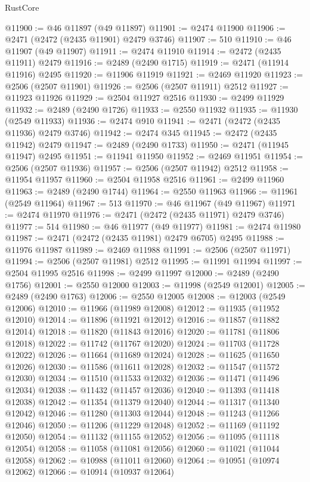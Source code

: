 \begin{lexlean}{RustCore}
\begin{coremodule}
@11900 := @46 @11897 (@49 @11897)
@11901 := @2474 @11900
@11906 := @2471 (@2472 (@2435 @11901) @2479 @3746)
@11907 := 510
@11910 := @46 @11907 (@49 @11907)
@11911 := @2474 @11910
@11914 := @2472 (@2435 @11911) @2479
@11916 := @2489 (@2490 @1715)
@11919 := @2471 (@11914 @11916) @2495
@11920 := @11906 @11919
@11921 := @2469 @11920
@11923 := @2506 (@2507 @11901)
@11926 := @2506 (@2507 @11911) @2512
@11927 := @11923 @11926
@11929 := @2504 @11927 @2516
@11930 := @2499 @11929
@11932 := @2489 (@2490 @1726)
@11933 := @2550 @11932
@11935 := @11930 (@2549 @11933)
@11936 := @2474 @910
@11941 := @2471 (@2472 (@2435 @11936) @2479 @3746)
@11942 := @2474 @345
@11945 := @2472 (@2435 @11942) @2479
@11947 := @2489 (@2490 @1733)
@11950 := @2471 (@11945 @11947) @2495
@11951 := @11941 @11950
@11952 := @2469 @11951
@11954 := @2506 (@2507 @11936)
@11957 := @2506 (@2507 @11942) @2512
@11958 := @11954 @11957
@11960 := @2504 @11958 @2516
@11961 := @2499 @11960
@11963 := @2489 (@2490 @1744)
@11964 := @2550 @11963
@11966 := @11961 (@2549 @11964)
@11967 := 513
@11970 := @46 @11967 (@49 @11967)
@11971 := @2474 @11970
@11976 := @2471 (@2472 (@2435 @11971) @2479 @3746)
@11977 := 514
@11980 := @46 @11977 (@49 @11977)
@11981 := @2474 @11980
@11987 := @2471 (@2472 (@2435 @11981) @2479 @6705) @2495
@11988 := @11976 @11987
@11989 := @2469 @11988
@11991 := @2506 (@2507 @11971)
@11994 := @2506 (@2507 @11981) @2512
@11995 := @11991 @11994
@11997 := @2504 @11995 @2516
@11998 := @2499 @11997
@12000 := @2489 (@2490 @1756)
@12001 := @2550 @12000
@12003 := @11998 (@2549 @12001)
@12005 := @2489 (@2490 @1763)
@12006 := @2550 @12005
@12008 := @12003 (@2549 @12006)
@12010 := @11966 (@11989 @12008)
@12012 := @11935 (@11952 @12010)
@12014 := @11896 (@11921 @12012)
@12016 := @11857 (@11882 @12014)
@12018 := @11820 (@11843 @12016)
@12020 := @11781 (@11806 @12018)
@12022 := @11742 (@11767 @12020)
@12024 := @11703 (@11728 @12022)
@12026 := @11664 (@11689 @12024)
@12028 := @11625 (@11650 @12026)
@12030 := @11586 (@11611 @12028)
@12032 := @11547 (@11572 @12030)
@12034 := @11510 (@11533 @12032)
@12036 := @11471 (@11496 @12034)
@12038 := @11432 (@11457 @12036)
@12040 := @11393 (@11418 @12038)
@12042 := @11354 (@11379 @12040)
@12044 := @11317 (@11340 @12042)
@12046 := @11280 (@11303 @12044)
@12048 := @11243 (@11266 @12046)
@12050 := @11206 (@11229 @12048)
@12052 := @11169 (@11192 @12050)
@12054 := @11132 (@11155 @12052)
@12056 := @11095 (@11118 @12054)
@12058 := @11058 (@11081 @12056)
@12060 := @11021 (@11044 @12058)
@12062 := @10988 (@11011 @12060)
@12064 := @10951 (@10974 @12062)
@12066 := @10914 (@10937 @12064)

\end{coremodule}
\end{lexlean}
